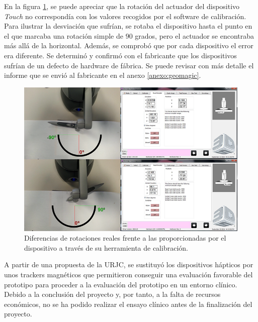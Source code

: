 En la figura \ref{fig:errorhaptic}, se puede apreciar que la rotación del actuador del dispositivo \emph{Touch}  no correspondía con los valores recogidos por el software de calibración. Para ilustrar la desviación que sufrían, se rotaba el dispositivo hasta el punto en el que marcaba una rotación simple de $90$ grados, pero el actuador se encontraba más allá de la horizontal. Además, se comprobó que por cada dispositivo el error era diferente. Se determinó y confirmó con el fabricante que los dispositivos sufrían de un defecto de hardware de fábrica. Se puede revisar con más detalle el informe que se envió al fabricante en el anexo \ref{anexo:geomagic}.


\begin{figure}[h]
\centering
\includegraphics[width=0.9\linewidth]{IMG/errorhaptic.png}
\caption{\label{fig:errorhaptic}Diferencias de rotaciones reales frente a las proporcionadas por el dispositivo a través de su herramienta de calibración.}
\end{figure}



A partir de una propuesta de la \ac{URJC}, se sustituyó los dispositivos hápticos por unos \acs{tracker}s magnéticos que permitieron conseguir una evaluación favorable del prototipo para proceder a la evaluación del prototipo en un entorno clínico. Debido a la conclusión del proyecto y, por tanto, a la falta de recursos económicos, no se ha podido realizar el ensayo clínico antes de la finalización del proyecto.



